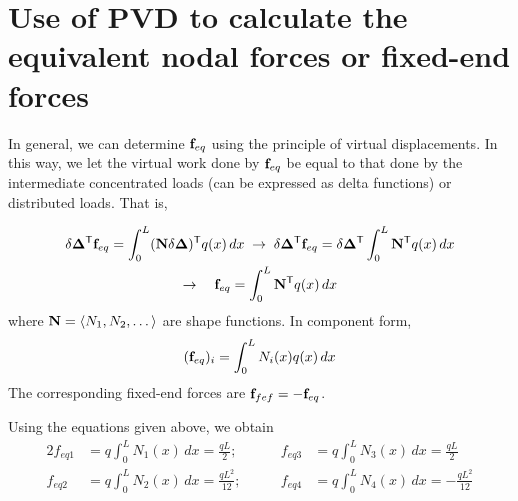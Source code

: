 \section{Use of PVD to calculate the equivalent nodal forces or fixed-end forces}
In general, we can determine $\mathbf{f}_{eq}$ using the principle of virtual displacements. In this way, we let the virtual work done by $\mathbf{f}_{eq}$ be equal to that done by the intermediate concentrated loads (can be expressed as delta functions) or distributed loads. That is,
\begin{fig}
  
\end{fig}
\begin{gather}
  \delta\bm{\Delta}^{\mathsf{T}}\mathbf{f}_{eq} = \int_0^L(\mathbf{N}\delta\bm{\Delta})^{\mathsf{T}} q(x)\,dx
  \;\rightarrow\; \delta\bm{\Delta}^{\mathsf{T}}\mathbf{f}_{eq} = \delta\bm{\Delta}^{\mathsf{T}}\int_0^L\mathbf{N}^{\mathsf{T}} q(x)\,dx\\
  \rightarrow\quad \mathbf{f}_{eq} = \int_0^L\mathbf{N}^{\mathsf{T}} q(x)\,dx
\end{gather}
where $\mathbf{N} = \langle N_1, N_2, \dots\rangle$ are shape functions. In component form,
\begin{equation}
  (\mathbf{f}_{eq})_i = \int_0^L N_i(x)q(x)\,dx
\end{equation}
The corresponding fixed-end forces are $\mathbf{f}_{fef} = -\mathbf{f}_{eq}$.

\begin{example}
\leavevmode
\begin{fig}
  
\end{fig}
Using the equations given above, we obtain
\begin{alignat*}{2}
  f_{eq1} &= q\int_0^L N_1(x)\,dx = \frac{qL}{2};&\qquad f_{eq3} &= q\int_0^L N_3(x)\,dx = \frac{qL}{2}\\
  f_{eq2} &= q\int_0^L N_2(x)\,dx = \frac{qL^2}{12};&\qquad f_{eq4} &= q\int_0^L N_4(x)\,dx = -\frac{qL^2}{12}
\end{alignat*}
\end{example}

